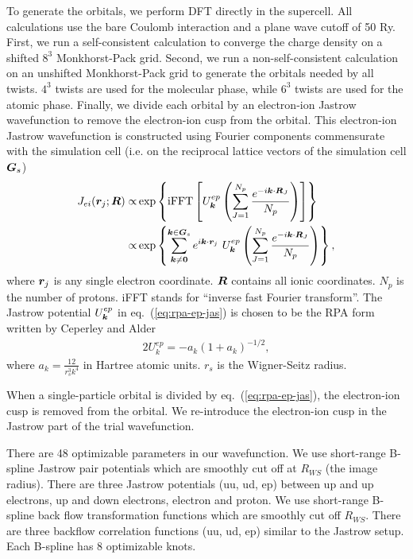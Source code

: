 To generate the orbitals, we perform DFT directly in the supercell. All calculations use the bare Coulomb interaction and a plane wave cutoff of 50 Ry. First, we run a self-consistent calculation to converge the charge density on a shifted $8^3$ Monkhorst-Pack grid. Second, we run a non-self-consistent calculation on an unshifted Monkhorst-Pack grid to generate the orbitals needed by all twists. $4^3$ twists are used for the molecular phase, while $6^3$ twists are used for the atomic phase. Finally, we divide each orbital by an electron-ion Jastrow wavefunction to remove the electron-ion cusp from the orbital. This electron-ion Jastrow wavefunction is constructed using Fourier components commensurate with the simulation cell (i.e. on the reciprocal lattice vectors of the simulation cell $\boldsymbol{G}_s$)
\begin{align}
J_{ei}(\boldsymbol{r}_j; \boldsymbol{R}) \propto& \exp\left\{ \text{iFFT}\left[ 
U_{\boldsymbol{k}}^{ep}  \left(\sum\limits_{J=1}^{N_p} \frac{e^{-i\boldsymbol{k}\cdot\boldsymbol{R}_J}}{N_p}  \right)
\right] \right\} \nonumber\\
\propto& \exp\left\{ 
\sum\limits_{\boldsymbol{k}\neq\boldsymbol{0}}^{\boldsymbol{k}\in\boldsymbol{G}_s} e^{i\boldsymbol{k}\cdot\boldsymbol{r}_j}~
U_{\boldsymbol{k}}^{ep} 
\left(\sum\limits_{J=1}^{N_p} \frac{e^{-i\boldsymbol{k}\cdot\boldsymbol{R}_J}}{N_p}  \right)
\right\},\label{eq:rpa-ep-jas}
\end{align}
where $\boldsymbol{r}_j$ is any single electron coordinate. $\boldsymbol{R}$ contains all ionic coordinates. $N_p$ is the number of protons. iFFT stands for ``inverse fast Fourier transform''. The Jastrow potential $U_{\boldsymbol{k}}^{ep}$ in eq.~(\ref{eq:rpa-ep-jas}) is chosen to be the RPA form written by Ceperley and Alder
\begin{align}
2U^{ep}_k = -a_k(1+a_k)^{-1/2},
\end{align}
where $a_k=\frac{12}{r_s^3k^4}$ in Hartree atomic units. $r_s$ is the Wigner-Seitz radius.

When a single-particle orbital is divided by eq.~(\ref{eq:rpa-ep-jas}), the electron-ion cusp is removed from the orbital. We re-introduce the electron-ion cusp in the Jastrow part of the trial wavefunction. 

There are 48 optimizable parameters in our wavefunction. We use short-range B-spline Jastrow pair potentials which are smoothly cut off at $R_{WS}$ (the image radius). There are three Jastrow potentials (uu, ud, ep) between up and up electrons, up and down electrons, electron and proton. We use short-range B-spline back flow transformation functions which are smoothly cut off $R_{WS}$. There are three backflow correlation functions (uu, ud, ep) similar to the Jastrow setup. Each B-spline has 8 optimizable knots.


